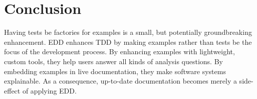 \documentclass[acmsmall,screen,authorversion,nonacm]{acmart} %
\begin{document}
\section{Conclusion}\label{sec:conclusion}

Having tests be factories for examples is a small, but potentially groundbreaking enhancement.
EDD enhances TDD by making examples rather than tests be the focus of the development process.
By enhancing examples with lightweight, custom tools, they help users answer all kinds of analysis questions.
By embedding examples in live documentation, they make software systems explainable.
As a consequence, up-to-date documentation becomes merely a side-effect of applying EDD.





\end{document}
